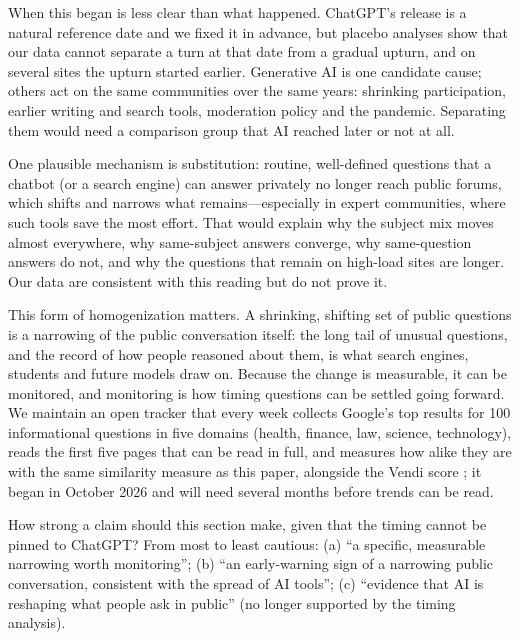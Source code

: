 \documentclass[11pt]{article}
\begin{document}
When this began is less clear than what happened. ChatGPT's release is a natural reference date and
we fixed it in advance, but placebo analyses show that our data cannot separate a turn at that date
from a gradual upturn, and on several sites the upturn started earlier. Generative AI is one candidate
cause; others act on the same communities over the same years: shrinking participation, earlier
writing and search tools, moderation policy and the pandemic. Separating them would need a comparison
group that AI reached later or not at all.

One plausible mechanism is substitution: routine, well-defined questions that a chatbot (or a search
engine) can answer privately no longer reach public forums, which shifts and narrows what
remains---especially in expert communities, where such tools save the most effort. That would explain
why the subject mix moves almost everywhere, why same-subject answers converge, why same-question
answers do not, and why the questions that remain on high-load sites are longer. Our data are
consistent with this reading but do not prove it.

This form of homogenization matters. A shrinking, shifting set of public questions is a narrowing of
the public conversation itself: the long tail of unusual questions, and the record of how people
reasoned about them, is what search engines, students and future models draw on. Because the change
is measurable, it can be monitored, and monitoring is how timing questions can be settled going forward. We maintain an open
tracker that every week collects Google's top results for 100 informational questions in five
domains (health, finance, law, science, technology), reads the first five pages that can be read in
full, and measures how alike they are with the same similarity measure as this paper, alongside the
Vendi score \citep{friedman2023vendi}; it began in October 2026 and will need several months before
trends can be read.

\begin{framing}
How strong a claim should this section make, given that the timing cannot be pinned to ChatGPT?
From most to least cautious: (a) ``a specific, measurable narrowing worth monitoring'';
(b) ``an early-warning sign of a narrowing public conversation, consistent with the spread of
AI tools''; (c) ``evidence that AI is reshaping what people ask in public'' (no longer supported
by the timing analysis).
\end{framing}

\end{document}
